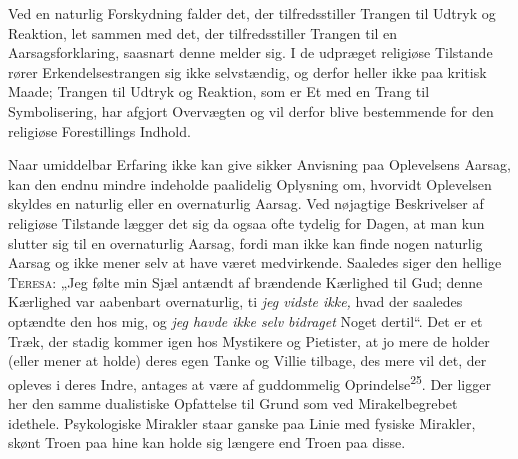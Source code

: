 \documentclass[12pt,a4paper,openany]{book}
\newcommand{\opage}[1]{\marginnote{\footnotesize\textit{[#1]}}}
\begin{document}
Ved en naturlig Forskydning falder det, der tilfredsstiller Trangen til
Udtryk og Reaktion, let sammen med det, der tilfredsstiller Trangen til
en Aarsagsforklaring, saasnart denne melder sig. I de udpræget religiøse
Tilstande rører Erkendelsestrangen sig ikke selvstændig, og derfor
heller ikke paa kritisk Maade; Trangen til Udtryk og Reaktion, som er Et
med en Trang til Symbolisering, har afgjort Overvægten og vil derfor
blive bestemmende for den religiøse Forestillings Indhold.

Naar umiddelbar Erfaring ikke kan give sikker Anvisning paa Oplevelsens
Aarsag, kan den endnu mindre indeholde paalidelig Oplysning om, hvorvidt
Oplevelsen skyldes en naturlig eller en overnaturlig Aarsag. Ved
nøjagtige Beskrivelser af religiøse Tilstande lægger det sig da ogsaa
ofte tydelig for Dagen, at man kun slutter sig til en overnaturlig
Aarsag, fordi man ikke kan finde nogen naturlig Aarsag og ikke mener
selv at have været
\opage{59}medvirkende. Saaledes siger den hellige \textsc{Teresa:} „Jeg
følte min Sjæl antændt af brændende Kærlighed til Gud; denne Kærlighed
var aabenbart overnaturlig, ti \textit{jeg vidste ikke,} hvad der
saaledes optændte den hos mig, og \textit{jeg havde ikke selv bidraget}
Noget dertil“. Det er et Træk, der stadig kommer igen hos Mystikere og
Pietister, at jo mere de holder (eller mener at holde) deres egen Tanke
og Villie tilbage, des mere vil det, der opleves i deres Indre, antages
at være af guddommelig Oprindelse\textsuperscript{25}. Der ligger her
den samme dualistiske Opfattelse til Grund som ved Mirakelbegrebet
idethele. Psykologiske Mirakler staar ganske paa Linie med fysiske
Mirakler, skønt Troen paa hine kan holde sig længere end Troen paa
disse.
\end{document}
